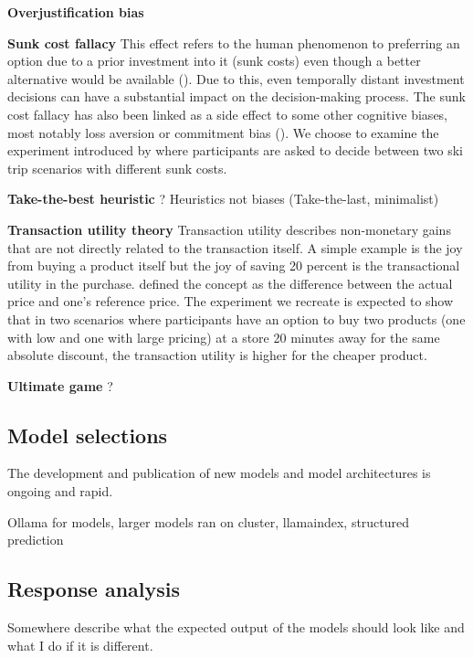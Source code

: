 \par \textbf{Overjustification bias} 

\par \textbf{Sunk cost fallacy} This effect refers to the human phenomenon to preferring an option due to a prior investment into it (sunk costs) even though a better alternative would be available (\cite{arkes1985psychology}). Due to this, even temporally distant investment decisions can have a substantial impact on the decision-making process. The sunk cost fallacy has also been linked as a side effect to some other cognitive biases, most notably loss aversion or commitment bias (\cite{jarmolowicz2016sunk}). We choose to examine the experiment introduced by \cite{arkes1985psychology} where participants are asked to decide between two ski trip scenarios with different sunk costs.

\par \textbf{Take-the-best heuristic} ? Heuristics not biases (Take-the-last, minimalist)

\par \textbf{Transaction utility theory} Transaction utility describes non-monetary gains that are not directly related to the transaction itself. A simple example is the joy from buying a product itself but the joy of saving 20 percent is the transactional utility in the purchase. \cite{thaler1983transaction} defined the concept as the difference between the actual price and one's reference price. The experiment we recreate is expected to show that in two scenarios where participants have an option to buy two products (one with low and one with large pricing) at a store 20 minutes away for the same absolute discount, the transaction utility is higher for the cheaper product.

\par \textbf{Ultimate game} ?


\subsection{Model selections}
\par The development and publication of new models and model architectures is ongoing and rapid. 

Ollama for models, larger models ran on cluster, llamaindex, structured prediction


\subsection{Response analysis}
Somewhere describe what the expected output of the models should look like and what I do if it is different.

